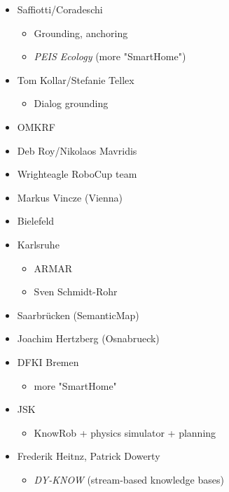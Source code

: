\documentclass[twocolumn,a4paper]{article}
\begin{document}
\begin{itemize}
	\item  Saffiotti/Coradeschi
	\begin{itemize}
		\item  Grounding, anchoring
		\item  \emph{PEIS Ecology} (more "SmartHome")
	\end{itemize}

	\item  Tom Kollar/Stefanie Tellex
	\begin{itemize}
		\item  Dialog grounding
	\end{itemize}

	\item  OMKRF
	\item  Deb Roy/Nikolaos Mavridis
	\item  Wrighteagle RoboCup team
	\item  Markus Vincze (Vienna)
	\item  Bielefeld
	\item  Karlsruhe
	\begin{itemize}
		\item  ARMAR
		\item  Sven Schmidt-Rohr
	\end{itemize}

	\item  Saarbrücken (SemanticMap)
	\item  Joachim Hertzberg (Osnabrueck)
	\item  DFKI Bremen
	\begin{itemize}
		\item  more "SmartHome"
	\end{itemize}

	\item  JSK
	\begin{itemize}
		\item  KnowRob + physics simulator + planning
	\end{itemize}

	\item  Frederik Heitnz, Patrick Dowerty
	\begin{itemize}
		\item  \emph{DY-KNOW} (stream-based knowledge bases)
	\end{itemize}

\end{itemize}
\end{document}
